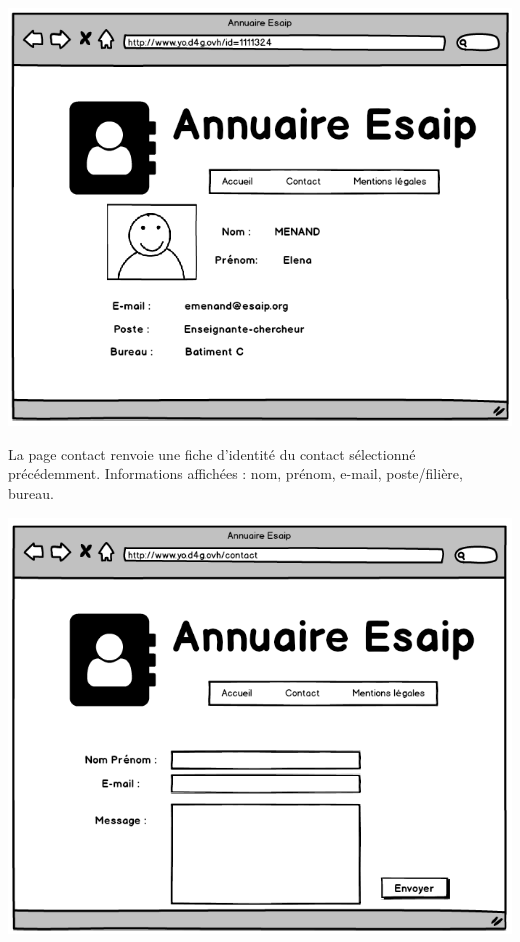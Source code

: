 \documentclass[11pt,a4paper]{report}
\begin{document}
			\begin{center}
					\includegraphics[scale=0.4]{site2}
			\end{center}
			La page contact renvoie une fiche d'identité du contact sélectionné précédemment. Informations affichées : nom, prénom, e-mail, poste/filière, bureau.
			\begin{center}
					\includegraphics[scale=0.4]{site3}
			\end{center}
			
\end{document}
